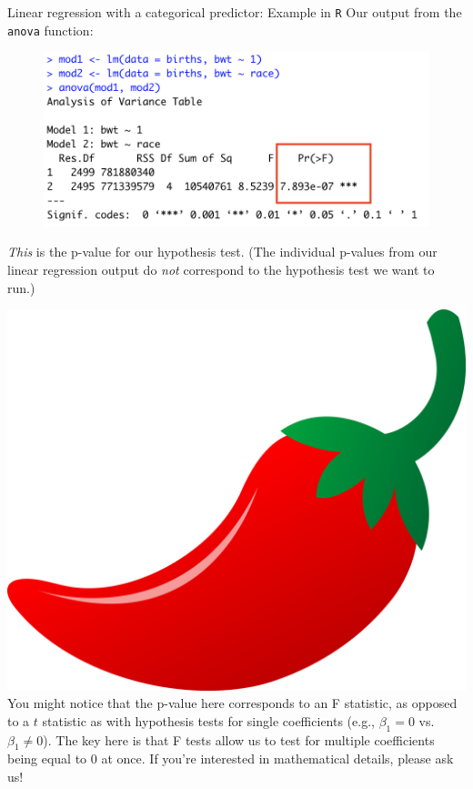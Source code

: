 \documentclass[10pt,t]{beamer}
\begin{document}
\begin{frame}{Linear regression with a categorical predictor: Example in \texttt{R}}
Our output from the \texttt{anova} function:

\vspace{0.3cm}

\begin{figure}
	\centering \includegraphics[scale=0.4]{anova_race2.png}
\end{figure}

\vspace{0.3cm}

\textit{This} is the p-value for our hypothesis test. (The individual p-values from our linear regression output do \textit{not} correspond to the hypothesis test we want to run.) \pause

\vspace{0.3cm}


\includegraphics[scale=0.01]{chilipepper.png} \tiny You might notice that the p-value here corresponds to an F statistic, as opposed to a $t$ statistic as with hypothesis tests for single coefficients (e.g., $\beta_1 = 0$ vs. $\beta_1 \neq 0$). The key here is that F tests allow us to test for multiple coefficients being equal to $0$ at once. If you're interested in mathematical details, please ask us!

\end{frame}
\end{document}
